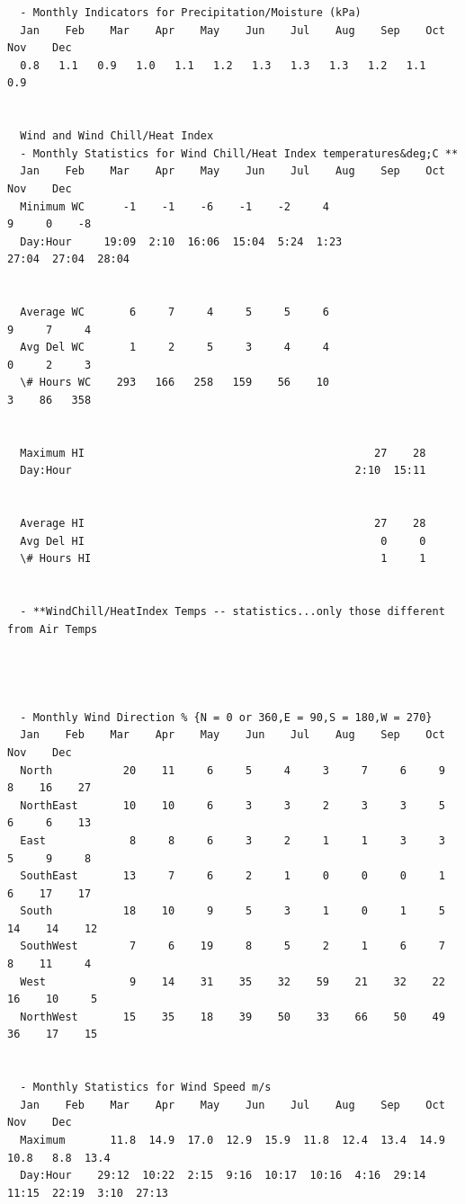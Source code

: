 \begin{lstlisting}
  - Monthly Indicators for Precipitation/Moisture (kPa)
  Jan    Feb    Mar    Apr    May    Jun    Jul    Aug    Sep    Oct    Nov    Dec
  0.8   1.1   0.9   1.0   1.1   1.2   1.3   1.3   1.3   1.2   1.1   0.9


  Wind and Wind Chill/Heat Index
  - Monthly Statistics for Wind Chill/Heat Index temperatures&deg;C **
  Jan    Feb    Mar    Apr    May    Jun    Jul    Aug    Sep    Oct    Nov    Dec
  Minimum WC      -1    -1    -6    -1    -2     4                         9     0    -8
  Day:Hour     19:09  2:10  16:06  15:04  5:24  1:23                     27:04  27:04  28:04


  Average WC       6     7     4     5     5     6                         9     7     4
  Avg Del WC       1     2     5     3     4     4                         0     2     3
  \# Hours WC    293   166   258   159    56    10                         3    86   358


  Maximum HI                                             27    28                    
  Day:Hour                                            2:10  15:11                    


  Average HI                                             27    28                    
  Avg Del HI                                              0     0                    
  \# Hours HI                                             1     1                    


  - **WindChill/HeatIndex Temps -- statistics...only those different from Air Temps




  - Monthly Wind Direction % {N = 0 or 360,E = 90,S = 180,W = 270}
  Jan    Feb    Mar    Apr    May    Jun    Jul    Aug    Sep    Oct    Nov    Dec
  North           20    11     6     5     4     3     7     6     9     8    16    27
  NorthEast       10    10     6     3     3     2     3     3     5     6     6    13
  East             8     8     6     3     2     1     1     3     3     5     9     8
  SouthEast       13     7     6     2     1     0     0     0     1     6    17    17
  South           18    10     9     5     3     1     0     1     5    14    14    12
  SouthWest        7     6    19     8     5     2     1     6     7     8    11     4
  West             9    14    31    35    32    59    21    32    22    16    10     5
  NorthWest       15    35    18    39    50    33    66    50    49    36    17    15


  - Monthly Statistics for Wind Speed m/s
  Jan    Feb    Mar    Apr    May    Jun    Jul    Aug    Sep    Oct    Nov    Dec
  Maximum       11.8  14.9  17.0  12.9  15.9  11.8  12.4  13.4  14.9  10.8   8.8  13.4
  Day:Hour    29:12  10:22  2:15  9:16  10:17  10:16  4:16  29:14  11:15  22:19  3:10  27:13



\end{lstlisting}

